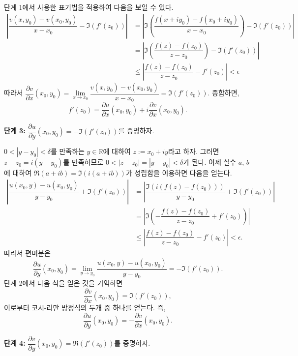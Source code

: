 단계 1에서 사용한 표기법을 적용하여 다음을 보일 수 있다.
\begin{align*}
\left| \dfrac{v(x,y_0) - v(x_0, y_0)}{x-x_0} - \Im(f'(z_0)) \right| 
&= \left| \Im\left(\dfrac{f(x+iy_0)-f(x_0+iy_0)}{x-x_0}\right) - \Im(f'(z_0)) \right| \\
&= \left| \Im\left(\dfrac{f(z)-f(z_0)}{z-z_0}\right) - \Im(f'(z_0)) \right| \\
&\le \left| \dfrac{f(z)-f(z_0)}{z-z_0} - f'(z_0) \right| < \epsilon 
\end{align*}
따라서
$\dfrac{\partial v}{\partial x}(x_0, y_0) 
= \lim\limits_{x\to x_0} \dfrac{v(x,y_0) - v(x_0, y_0)}{x-x_0} 
= \Im(f'(z_0))$. 종합하면,
\begin{equation}\label{eq-2-5}
f'(z_0) = \dfrac{\partial u}{\partial x}(x_0, y_0)
+ i \dfrac{\partial v}{\partial x}(x_0, y_0).
\end{equation}

{\bf  단계 3:}
$\dfrac{\partial u}{\partial y}(x_0, y_0)  = - \Im(f'(z_0))$를 증명하자.

$0<|y-y_0|<\delta$를 만족하는 $y\in\mathbb R$에 대하여 $z:=x_0+iy$라고 하자.
그러면 $z-z_0 = i(y-y_0)$를 만족하므로
$0< |z-z_0| = |y-y_0| <\delta$가 된다.
이제 실수 $a$, $b$에 대하여
$\Re(a+ib) = \Im(i(a+ib))$가 성립함을 이용하면 다음을 얻는다.
\begin{align*}
\left| \dfrac{u(x_0,y) - u(x_0, y_0)}{y-y_0} + \Im(f'(z_0)) \right| 
&= \left| \dfrac{\Im(i(f(z)-f(z_0)))}{y-y_0} + \Im(f'(z_0)) \right| \\
&= \left| \Im\left(-\dfrac{f(z)-f(z_0)}{z-z_0} +f'(z_0) \right) \right| \\
&\le \left| \dfrac{f(z)-f(z_0)}{z-z_0} - f'(z_0) \right| < \epsilon .
\end{align*}
따라서 편미분은
$$
\dfrac{\partial u}{\partial y}(x_0, y_0) 
= \lim\limits_{y\to y_0} \dfrac{u(x_0,y) - u(x_0, y_0)}{y-y_0} 
= -\Im(f'(z_0)).
$$
단계 2에서 다음 식을 얻은 것을 기억하면
$$
\dfrac{\partial v}{\partial x}(x_0, y_0) 
= \Im(f'(z_0)),
$$
이로부터 코시-리만 방정식의 두개 중 하나를 얻는다. 즉,
$$
\dfrac{\partial u}{\partial y}(x_0, y_0) = - \dfrac{\partial v}{\partial x}(x_0, y_0).
$$

{\bf 단계 4:}
$\dfrac{\partial v}{\partial y}(x_0, y_0)  = \Re(f'(z_0))$를 증명하자.

